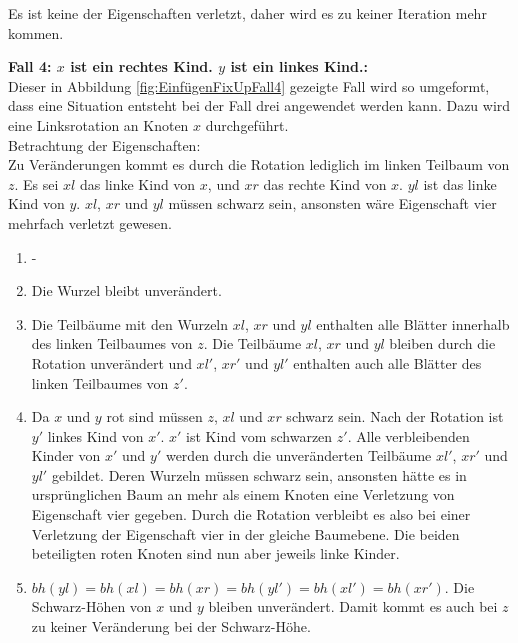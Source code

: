 \documentclass[a4paper,12pt]{article}
\begin{document}
\noindent Es ist keine der Eigenschaften verletzt, daher wird es zu keiner Iteration mehr kommen.


\noindent\textbf{Fall 4: $x$ ist ein rechtes Kind. $y$ ist ein linkes Kind.: }\\      
Dieser in Abbildung \ref{fig:EinfügenFixUpFall4} gezeigte Fall wird so umgeformt, dass eine Situation entsteht bei der Fall drei angewendet werden kann. Dazu wird eine Linksrotation an Knoten $x$ durchgeführt.\\

\noindent Betrachtung der Eigenschaften:\\
Zu Veränderungen kommt es durch die Rotation lediglich im linken Teilbaum von $z$. Es sei $\mathit{xl}$ das linke Kind von $x$,  und $\mathit{xr}$ das rechte Kind von $x$. $\mathit{yl}$ ist das linke Kind von $y$. $\mathit{xl}$, $\mathit{xr}$ und $\mathit{yl}$ müssen schwarz sein, ansonsten wäre Eigenschaft vier mehrfach verletzt gewesen.
\begin{enumerate}
	\item -
	\item Die Wurzel bleibt unverändert.
	\item  Die Teilbäume mit den Wurzeln $\mathit{xl}$, $\mathit{xr}$ und $\mathit{yl}$ enthalten alle Blätter innerhalb des linken Teilbaumes von $z$. Die Teilbäume  $\mathit{xl}$, $\mathit{xr}$ und $\mathit{yl}$ bleiben durch die Rotation unverändert und $\mathit{xl'}$, $\mathit{xr'}$ und $\mathit{yl'}$ enthalten auch alle Blätter des linken Teilbaumes von $z'$.
	\item Da $x$ und $y$ rot sind müssen $z$, $\mathit{xl}$ und $\mathit{xr}$ schwarz sein. Nach der Rotation ist $y'$ linkes Kind von $x'$. $x'$ ist Kind vom schwarzen $z'$. Alle verbleibenden Kinder von $x'$ und $y'$ werden durch die unveränderten Teilbäume $\mathit{xl'}$, $\mathit{xr'}$ und $\mathit{yl'}$ gebildet. Deren Wurzeln müssen schwarz sein, ansonsten hätte es in ursprünglichen Baum an mehr als einem Knoten eine Verletzung von Eigenschaft vier gegeben. Durch die Rotation verbleibt es also bei einer Verletzung der Eigenschaft vier in der gleiche Baumebene. Die beiden beteiligten roten Knoten sind nun aber jeweils linke Kinder.   
	\item $ \mathit{bh(yl)} = \mathit{bh(xl)} = \mathit{bh(xr)} = \mathit{bh(yl')} = \mathit{bh(xl')} = \mathit{bh(xr')} $. Die Schwarz-Höhen von $x$ und $y$ bleiben unverändert. Damit kommt es auch bei $z$ zu keiner Veränderung bei der Schwarz-Höhe. 
\end{enumerate}  
\end{document}
